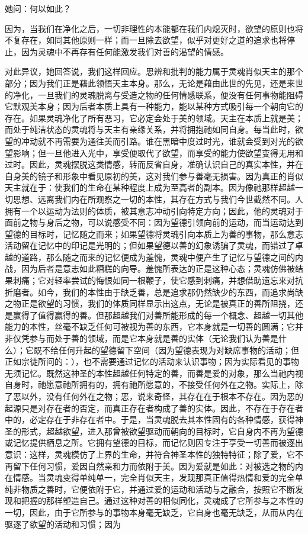 她问：何以如此？\par

因为，当我们在净化之后，一切非理性的本能都在我们内熄灭时，欲望的原则也将不复存在，如同其他原则一样；而一旦除去欲望，似乎对更好之道的追求也将停止，因为灵魂中不再存有任何能激发我们对善的渴望的情感。\par

对此异议，她回答说，我们这样回应。思辨和批判的能力属于灵魂肖似天主的那个部分；因为我们正是藉此领悟天主本身。那么，无论是藉由此世的先见，还是来世的净化，一旦我们的灵魂脱离与受造之物的任何情感联系，便没有任何事物能阻碍它默观美本身；因为后者本质上具有一种能力，能以某种方式吸引每一个朝向它的存在。如果灵魂净化了所有恶习，它必定会处于美的领域。天主在本质上就是美；而处于纯洁状态的灵魂将与天主有亲缘关系，并将拥抱祂如同自身。每当此时，欲望的冲动就不再需要为通往美而引路。谁在黑暗中度过时光，谁就会受到对光的欲望影响；但一旦他进入光中，享受便取代了欲望，而享受的能力使欲望变得无用和过时。因此，灵魂摆脱这类情感，转而反省自身，准确认识自己的真实本性，并在自身美的镜子和形象中看见原初的美，这对我们参与善毫无损害。因为真正的肖似天主就在于：使我们的生命在某种程度上成为至高者的副本。因为像祂那样超越一切思想、远离我们内在所观察之一切的本性，其存在方式与我们今世截然不同。人拥有一个以运动为法则的体质，被其意志冲动引向特定方向；因此，他的灵魂对于面前之物与身后之物，可以说感受不同：因为望德引领向前的运动，而当运动达到望德的目标时，记忆随之而来；如果望德将灵魂引向本质上为善的事物，那么意志活动留在记忆中的印记是光明的；但如果望德以善的幻象诱骗了灵魂，而错过了卓越的道路，那么随之而来的记忆便成为羞愧，灵魂中便产生了记忆与望德之间的内战，因为后者是意志如此糟糕的向导。羞愧所表达的正是这种心态；灵魂仿佛被结果刺痛；它对轻率尝试的悔恨如同一根鞭子，使它感到刺痛，并想借助遗忘来对抗折磨者。如今，我们的本性由于缺乏善，总是追求那仍然缺少的东西，而追求尚缺之物正是欲望的习惯，我们的体质同样显示出这点，无论是被真正的善所阻挠，还是赢得了值得赢得的善。但那超越我们对善所能形成的每一个概念、超越一切其他能力的本性，丝毫不缺乏任何可被视为善的东西，它本身就是一切善的圆满；它并非仅凭参与而处于善的领域，而是它本身就是善的实体（无论我们认为善是什么）；它既不给任何升起的望德留下空间（因为望德表现为对缺席事物的活动；但正如宗徒所问的：），也不需要通过记忆的活动来认识事物；因为实际看见的事物无须记忆。既然这神圣的本性超越任何特定的善，而善是爱的对象，那么当祂内视自身时，祂愿意祂所拥有的，拥有祂所愿意的，不接受任何外在之物。实际上，除了恶以外，没有任何外在之物；恶，说来奇怪，其存在在于根本不存在。因为恶的起源只是对存在者的否定，而真正存在者构成了善的实体。因此，不存在于存在者中的，必定存在于非存在者中。于是，当灵魂脱去其本性固有的各种情感，获得神圣的形式，超越欲望，进入那曾被欲望驱动而朝向的目标时，它自身内不再为望德或记忆提供栖息之所。它拥有望德的目标，而记忆则因专注于享受一切善而被逐出意识：这样，灵魂模仿了上界的生命，并符合神圣本性的独特特征；除了爱，它不再留下任何习惯，爱因自然亲和力而依附于美。因为爱就是如此：对被选之物的内在情感。当灵魂变得单纯单一，完全肖似天主，发现那真正值得热情和爱的完全单纯非物质之善时，它便依附于它，并通过爱的运动和活动与之融合，按照它不断发现和把握的那样塑造自己。通过这种对善的相似同化，灵魂成了它所参与之本性的一切，因此，由于它所参与的事物本身毫无缺乏，它自身也毫无缺乏，从而从内在驱逐了欲望的活动和习惯；因为